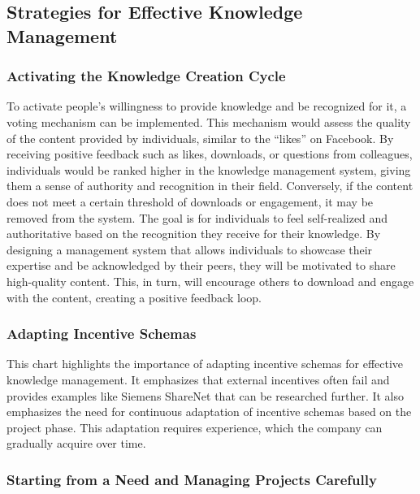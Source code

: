\subsection{Strategies for Effective Knowledge
    Management}\label{strategies-for-effective-knowledge-management}

\subsubsection{Activating the Knowledge Creation
    Cycle}\label{activating-the-knowledge-creation-cycle}

To activate people's willingness to provide knowledge and be recognized
for it, a voting mechanism can be implemented. This mechanism would
assess the quality of the content provided by individuals, similar to
the ``likes'' on Facebook. By receiving positive feedback such as likes,
downloads, or questions from colleagues, individuals would be ranked
higher in the knowledge management system, giving them a sense of
authority and recognition in their field. Conversely, if the content
does not meet a certain threshold of downloads or engagement, it may be
removed from the system. The goal is for individuals to feel
self-realized and authoritative based on the recognition they receive
for their knowledge. By designing a management system that allows
individuals to showcase their expertise and be acknowledged by their
peers, they will be motivated to share high-quality content. This, in
turn, will encourage others to download and engage with the content,
creating a positive feedback loop.

\subsubsection{Adapting Incentive
    Schemas}\label{adapting-incentive-schemas}

This chart highlights the importance of adapting incentive schemas for
effective knowledge management. It emphasizes that external incentives
often fail and provides examples like Siemens ShareNet that can be
researched further. It also emphasizes the need for continuous
adaptation of incentive schemas based on the project phase. This
adaptation requires experience, which the company can gradually acquire
over time.

\subsubsection{Starting from a Need and Managing Projects
    Carefully}\label{starting-from-a-need-and-managing-projects-carefully}

